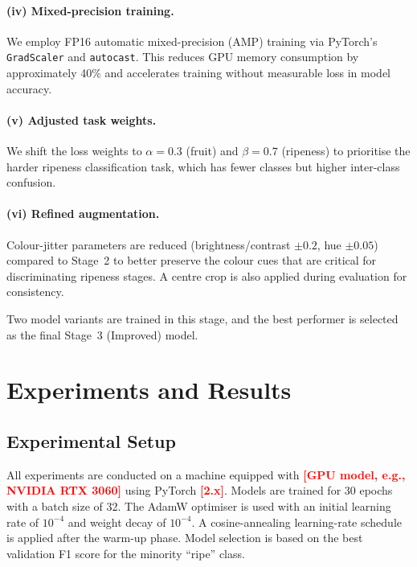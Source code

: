 \documentclass[10pt,twocolumn,letterpaper]{article}
\newcommand{\placeholder}[1]{\textcolor{red}{\textbf{[#1]}}}
\begin{document}
\paragraph{(iv) Mixed-precision training.}
We employ FP16 automatic mixed-precision (AMP) training via PyTorch's \texttt{GradScaler} and \texttt{autocast}.
This reduces GPU memory consumption by approximately 40\% and accelerates training without measurable loss in model accuracy.

\paragraph{(v) Adjusted task weights.}
We shift the loss weights to $\alpha = 0.3$ (fruit) and $\beta = 0.7$ (ripeness) to prioritise the harder ripeness classification task, which has fewer classes but higher inter-class confusion.

\paragraph{(vi) Refined augmentation.}
Colour-jitter parameters are reduced (brightness/contrast $\pm 0.2$, hue $\pm 0.05$) compared to Stage~2 to better preserve the colour cues that are critical for discriminating ripeness stages.
A centre crop is also applied during evaluation for consistency.

Two model variants are trained in this stage, and the best performer is selected as the final Stage~3 (Improved) model.

\section{Experiments and Results}
\label{sec:experiments}

\subsection{Experimental Setup}
\label{sec:setup}

All experiments are conducted on a machine equipped with \placeholder{GPU model, e.g., NVIDIA RTX 3060} using PyTorch \placeholder{2.x}.
Models are trained for 30 epochs with a batch size of 32.
The AdamW optimiser is used with an initial learning rate of $10^{-4}$ and weight decay of $10^{-4}$.
A cosine-annealing learning-rate schedule is applied after the warm-up phase.
Model selection is based on the best validation F1 score for the minority ``ripe'' class.
\end{document}
